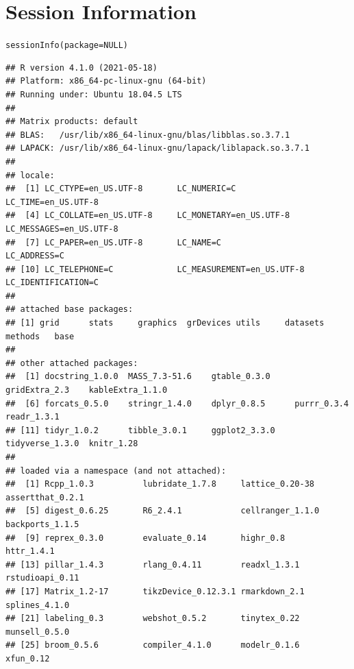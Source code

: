 \documentclass{article}\usepackage[]{graphicx}\usepackage[]{color}
\makeatletter
\newcommand{\hlstd}[1]{\textcolor[rgb]{0.196,0.196,0.196}{#1}}%
\newcommand{\hlkwa}[1]{\textcolor[rgb]{0.231,0.416,0.784}{#1}}%
\newcommand{\hlkwc}[1]{\textcolor[rgb]{0,0.631,0.314}{#1}}%
\newcommand{\hlkwd}[1]{\textcolor[rgb]{0.78,0.227,0.412}{#1}}%
\newenvironment{kframe}{%
 \def\at@end@of@kframe{}%
 \ifinner\ifhmode%
  \def\at@end@of@kframe{\end{minipage}}%
  \begin{minipage}{\columnwidth}%
 \fi\fi%
 \def\FrameCommand##1{\hskip\@totalleftmargin \hskip-\fboxsep
 \colorbox{shadecolor}{##1}\hskip-\fboxsep
     \hskip-\linewidth \hskip-\@totalleftmargin \hskip\columnwidth}%
 \MakeFramed {\advance\hsize-\width
   \@totalleftmargin\z@ \linewidth\hsize
   \@setminipage}}%
 {\par\unskip\endMakeFramed%
 \at@end@of@kframe}
\newenvironment{knitrout}{}{} %
\makeatother
\begin{document}
\clearpage


\section*{Session Information}

\begin{knitrout}
\color{fgcolor}\begin{kframe}
\begin{alltt}
\hlkwd{sessionInfo}\hlstd{(}\hlkwc{package} \hlstd{=} \hlkwa{NULL}\hlstd{)}
\end{alltt}
\begin{verbatim}
## R version 4.1.0 (2021-05-18)
## Platform: x86_64-pc-linux-gnu (64-bit)
## Running under: Ubuntu 18.04.5 LTS
## 
## Matrix products: default
## BLAS:   /usr/lib/x86_64-linux-gnu/blas/libblas.so.3.7.1
## LAPACK: /usr/lib/x86_64-linux-gnu/lapack/liblapack.so.3.7.1
## 
## locale:
##  [1] LC_CTYPE=en_US.UTF-8       LC_NUMERIC=C               LC_TIME=en_US.UTF-8       
##  [4] LC_COLLATE=en_US.UTF-8     LC_MONETARY=en_US.UTF-8    LC_MESSAGES=en_US.UTF-8   
##  [7] LC_PAPER=en_US.UTF-8       LC_NAME=C                  LC_ADDRESS=C              
## [10] LC_TELEPHONE=C             LC_MEASUREMENT=en_US.UTF-8 LC_IDENTIFICATION=C       
## 
## attached base packages:
## [1] grid      stats     graphics  grDevices utils     datasets  methods   base     
## 
## other attached packages:
##  [1] docstring_1.0.0  MASS_7.3-51.6    gtable_0.3.0     gridExtra_2.3    kableExtra_1.1.0
##  [6] forcats_0.5.0    stringr_1.4.0    dplyr_0.8.5      purrr_0.3.4      readr_1.3.1     
## [11] tidyr_1.0.2      tibble_3.0.1     ggplot2_3.3.0    tidyverse_1.3.0  knitr_1.28      
## 
## loaded via a namespace (and not attached):
##  [1] Rcpp_1.0.3          lubridate_1.7.8     lattice_0.20-38     assertthat_0.2.1   
##  [5] digest_0.6.25       R6_2.4.1            cellranger_1.1.0    backports_1.1.5    
##  [9] reprex_0.3.0        evaluate_0.14       highr_0.8           httr_1.4.1         
## [13] pillar_1.4.3        rlang_0.4.11        readxl_1.3.1        rstudioapi_0.11    
## [17] Matrix_1.2-17       tikzDevice_0.12.3.1 rmarkdown_2.1       splines_4.1.0      
## [21] labeling_0.3        webshot_0.5.2       tinytex_0.22        munsell_0.5.0      
## [25] broom_0.5.6         compiler_4.1.0      modelr_0.1.6        xfun_0.12          

\end{verbatim}
\end{kframe}
\end{knitrout}
\end{document}
